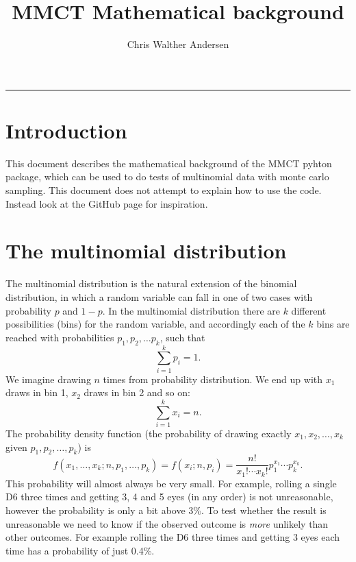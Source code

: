\documentclass[a4paper,article]{memoir}
\title{MMCT Mathematical background}
\author{Chris Walther Andersen}
\begin{document}
	
\setlength{\parindent}{0pt}

\maketitle
\fancybreak{$*\quad*\quad*$}
\vspace{5mm}

\chapter{Introduction}
This document describes the mathematical background of the MMCT pyhton package, 
which can be used to do tests of multinomial data with monte carlo sampling. 
This document does not attempt to explain how to use the code. Instead look at 
the GitHub page for inspiration.

\chapter{The multinomial distribution}
The multinomial distribution is the natural extension of the binomial 
distribution, in which a random variable can fall in one of two cases with 
probability $p$ and $1-p$. In the multinomial distribution there are $k$ 
different possibilities (bins) for the random variable, and accordingly each of 
the 
$k$ bins are reached with probabilities $p_1, p_2, \ldots p_k$, such 
that
\begin{equation}
	\sum_{i=1}^k p_i = 1.
\end{equation}
We imagine drawing $n$ times from probability distribution. We end up with 
$x_1$ draws in bin 1, $x_2$ draws in bin 2 and so on:
\begin{equation}
	\sum_{i=1}^k x_i = n.
\end{equation}
The probability density function (the probability of drawing exactly $x_1, x_2, 
\ldots, x_k$ given $p_1, p_2, \ldots, p_k$) is
\begin{equation}
	f(x_1,\ldots, x_k;n,p_1,\ldots,p_k) = f(x_i;n,p_i) = \frac{n!}{x_1! \cdots 
	x_k!} p_1^{x_1} \cdots p_k^{x_k}.
\end{equation}
This probability will almost always be very small. For example, rolling a single
D6 three times and getting 3, 4 and 5 eyes (in any order) is not unreasonable, 
however the probability is only a bit above 3\%. To test whether the result is
unreasonable we need to know if the observed outcome is \emph{more} unlikely 
than other outcomes. For example rolling the D6 three times and getting 3 eyes 
each time has a probability of just 0.4\%.

 

 


	
	
\end{document}
